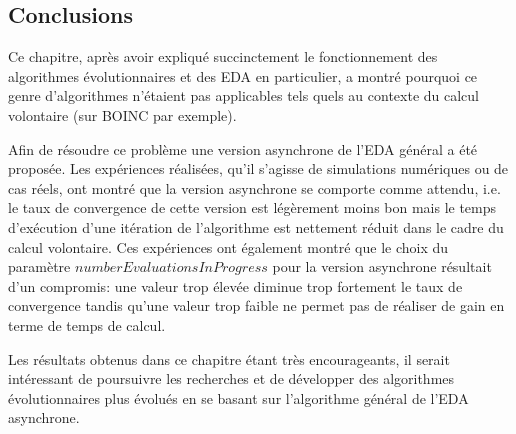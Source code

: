 \documentclass[a4paper, 12pt]{report}
\begin{document}
\subsection{Conclusions}
\label{conclueda}
Ce chapitre, après avoir expliqué succinctement le fonctionnement des algorithmes évolutionnaires et des EDA en particulier, a montré pourquoi ce genre d'algorithmes n'étaient pas applicables tels quels au contexte du calcul volontaire (sur \textsc{BOINC} par exemple). 

Afin de résoudre ce problème une version asynchrone de l'EDA général a été proposée. Les expériences réalisées, qu'il s'agisse de simulations numériques ou de cas réels, ont montré que la version asynchrone se comporte comme attendu, i.e. le taux de convergence de cette version est légèrement moins bon mais le temps d'exécution d'une itération de l'algorithme est nettement réduit dans le cadre du calcul volontaire. Ces expériences ont également montré que le choix du paramètre $numberEvaluationsInProgress$ pour la version asynchrone résultait d'un compromis: une valeur trop élevée diminue trop fortement le taux de convergence tandis qu'une valeur trop faible ne permet pas de réaliser de gain en terme de temps de calcul. 

Les résultats obtenus dans ce chapitre étant très encourageants, il serait intéressant de poursuivre les recherches et de développer des algorithmes évolutionnaires plus évolués en se basant sur l'algorithme général de l'EDA asynchrone.



\end{document}
